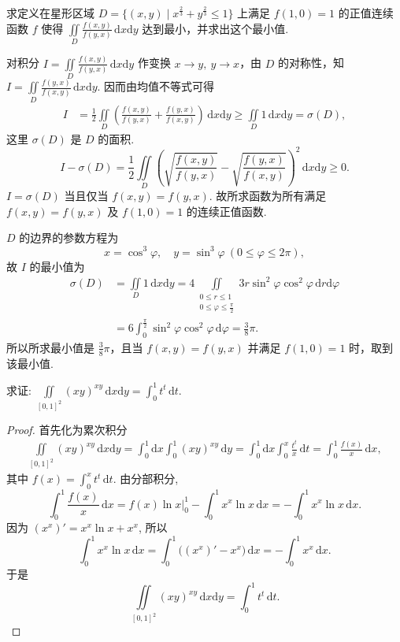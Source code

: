 \documentclass[../../main.tex]{subfiles}
\begin{document}
\begin{example}
求定义在星形区域 $D = \{(x,y) \mid x^{\frac{2}{3}} + y^{\frac{2}{3}} \leqslant 1\}$ 上满足 $f(1,0) = 1$ 的正值连续函数 $f$ 使得 $\iint\limits_D \frac{f(x,y)}{f(y,x)} \,\mathrm{d}x\mathrm{d}y$ 达到最小，并求出这个最小值.
\end{example}
\begin{solution}
对积分 $I = \iint\limits_D \frac{f(x,y)}{f(y,x)} \,\mathrm{d}x\mathrm{d}y$ 作变换 $x \to y,\ y \to x$，由 $D$ 的对称性，知 $I = \iint\limits_D \frac{f(y,x)}{f(x,y)} \,\mathrm{d}x\mathrm{d}y$. 因而由均值不等式可得
\begin{align*}
I &= \frac{1}{2} \iint\limits_D \left( \frac{f(x,y)}{f(y,x)} + \frac{f(y,x)}{f(x,y)} \right) \,\mathrm{d}x\mathrm{d}y \geqslant \iint\limits_D 1 \,\mathrm{d}x\mathrm{d}y = \sigma(D),
\end{align*}
这里 $\sigma(D)$ 是 $D$ 的面积.
\[
I - \sigma(D) = \frac{1}{2} \iint\limits_D \left( \sqrt{\frac{f(x,y)}{f(y,x)}} - \sqrt{\frac{f(y,x)}{f(x,y)}} \right)^2 \,\mathrm{d}x\mathrm{d}y \geqslant 0.
\]
$I = \sigma(D)$ 当且仅当 $f(x,y) = f(y,x)$. 故所求函数为所有满足 $f(x,y) = f(y,x)$ 及 $f(1,0) = 1$ 的连续正值函数.

$D$ 的边界的参数方程为
\[
x = \cos^3 \varphi,\quad y = \sin^3 \varphi\ (0 \leqslant \varphi \leqslant 2\pi),
\]
故 $I$ 的最小值为
\begin{align*}
\sigma(D) &= \iint\limits_D 1 \,\mathrm{d}x\mathrm{d}y = 4 \iint\limits_{\substack{0 \leqslant r \leqslant 1 \\ 0 \leqslant \varphi \leqslant \frac{\pi}{2}}} 3r \sin^2 \varphi \cos^2 \varphi \,\mathrm{d}r\mathrm{d}\varphi \\
&= 6 \int_0^{\frac{\pi}{2}} \sin^2 \varphi \cos^2 \varphi \,\mathrm{d}\varphi = \frac{3}{8}\pi.
\end{align*}
所以所求最小值是 $\frac{3}{8}\pi$，且当 $f(x,y) = f(y,x)$ 并满足 $f(1,0) = 1$ 时，取到该最小值.
\end{solution}

\begin{example}
求证: $\iint\limits_{[0,1]^2} (xy)^{xy} \, \mathrm{d}x\mathrm{d}y = \int_0^1 t^t \, \mathrm{d}t$.
\end{example}
\begin{proof}
首先化为累次积分
\begin{align*}
\iint\limits_{[0,1]^2} (xy)^{xy} \, \mathrm{d}x\mathrm{d}y = \int_0^1 \mathrm{d}x \int_0^1 (xy)^{xy} \, \mathrm{d}y = \int_0^1 \mathrm{d}x \int_0^x \frac{t^t}{x} \, \mathrm{d}t = \int_0^1 \frac{f(x)}{x} \, \mathrm{d}x,
\end{align*}
其中 $f(x) = \int_0^x t^t \, \mathrm{d}t$. 由分部积分,
\[
\int_0^1 \frac{f(x)}{x} \, \mathrm{d}x = f(x) \ln x \bigg|_0^1 - \int_0^1 x^x \ln x \, \mathrm{d}x = - \int_0^1 x^x \ln x \, \mathrm{d}x.
\]
因为 $(x^x)' = x^x \ln x + x^x$, 所以
\[
\int_0^1 x^x \ln x \, \mathrm{d}x = \int_0^1 \big( (x^x)' - x^x \big) \, \mathrm{d}x = - \int_0^1 x^x \, \mathrm{d}x.
\]
于是
\[
\iint\limits_{[0,1]^2} (xy)^{xy} \, \mathrm{d}x\mathrm{d}y = \int_0^1 t^t \, \mathrm{d}t.
\]
\end{proof}
\end{document}
